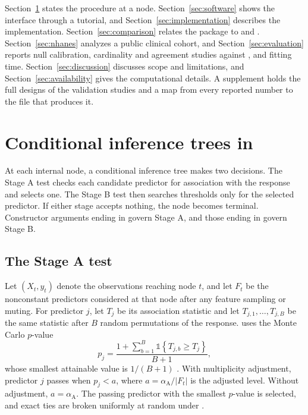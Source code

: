 \documentclass[article]{jss}
\newcommand{\citrees}{\pkg{citrees}\xspace}
\newcommand{\sklearn}{\pkg{scikit-learn}\xspace}
\begin{document}
Section~\ref{sec:procedure} states the procedure at a node.
Section~\ref{sec:software} shows the interface through a tutorial, and
Section~\ref{sec:implementation} describes the implementation.
Section~\ref{sec:comparison} relates the package to  and
\sklearn. Section~\ref{sec:nhanes} analyzes a public clinical cohort, and
Section~\ref{sec:evaluation} reports null calibration, cardinality and
agreement studies against , and fitting time.
Section~\ref{sec:discussion} discusses scope and limitations, and
Section~\ref{sec:availability} gives the computational details. A supplement
holds the full designs of the validation studies and a map from every
reported number to the file that produces it.

\section[Conditional inference trees in citrees]{Conditional inference trees in \citrees} \label{sec:procedure}

At each internal node, a conditional inference tree makes two decisions. The
Stage A test checks each candidate predictor for association with the response
and selects one. The Stage B test then searches thresholds only for the
selected predictor. If either stage accepts nothing, the node becomes
terminal. Constructor arguments ending in  govern Stage A, and
those ending in  govern Stage B.

\subsection{The Stage A test} \label{sec:screening}

Let $(X_t, y_t)$ denote the observations reaching node $t$, and let $F_t$ be
the nonconstant predictors considered at that node after any feature sampling
or muting. For predictor $j$, let $T_j$ be its association statistic and let
$T_{j,1},\ldots,T_{j,B}$ be the same statistic after $B$ random permutations
of the response. \citrees uses the Monte Carlo $p$-value
%
\begin{equation}
  p_j =
  \frac{1 + \sum_{b=1}^{B}
    \mathbb{1}\!\left\{T_{j,b} \geq T_j\right\}}
       {B + 1},
  \label{eq:permutation-p}
\end{equation}
%
whose smallest attainable value is $1/(B+1)$ \citep{Phipson+Smyth:2010}.
With multiplicity adjustment, predictor $j$ passes when $p_j < a$, where
$a = \alpha_{\mathrm{A}}/|F_t|$ is the adjusted level. Without adjustment,
$a = \alpha_{\mathrm{A}}$. The passing predictor with the smallest $p$-value
is selected, and exact ties are broken uniformly at random under
.
\end{document}
